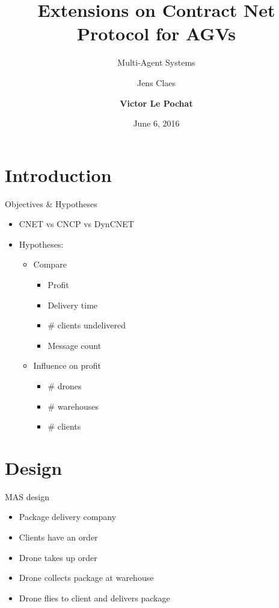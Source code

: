\documentclass{beamer}
\title{Extensions on Contract Net Protocol for AGVs}
\subtitle{Multi-Agent Systems}
\author{Jens Claes \and \textbf{Victor Le Pochat}}
\date{June 6, 2016}
\begin{document}
	\frame{\titlepage}
	
	\section{Introduction}
	\begin{frame}{Objectives \& Hypotheses}
		\begin{itemize}
		\item CNET vs CNCP vs DynCNET
		\item Hypotheses:
			\begin{itemize}
			\item Compare
				\begin{itemize}
				\item Profit
				\item Delivery time
				\item \# clients undelivered
				\item Message count
				\end{itemize}
			\item Influence on profit
				\begin{itemize}
				\item \# drones
				\item \# warehouses
				\item \# clients
				\end{itemize}
			\end{itemize}
		\end{itemize}
	\end{frame}

	\section{Design}
	
	\begin{frame}{MAS design}
		\begin{itemize}
			\item Package delivery company
			\item Clients have an order
			\item Drone takes up order
			\item Drone collects package at warehouse
			\item Drone flies to client and delivers package
		\end{itemize}
	\end{frame}
	
\end{document}
